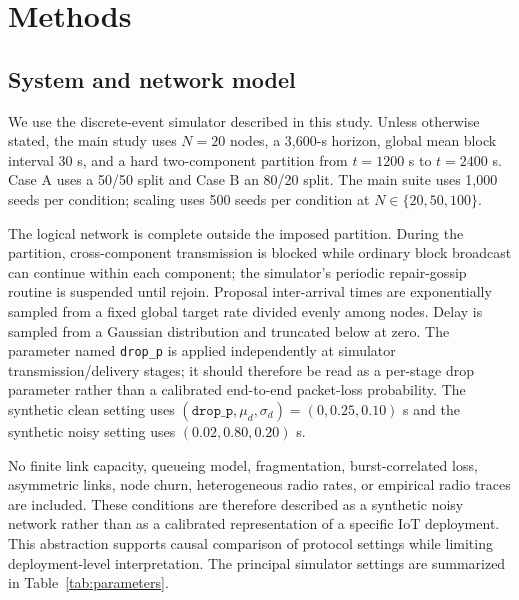 \documentclass[11pt]{article}
\begin{document}
\section{Methods}
\subsection{System and network model}
We use the discrete-event simulator described in this study. Unless otherwise stated, the main study uses $N=20$ nodes, a 3,600-s horizon, global mean block interval 30 s, and a hard two-component partition from $t=1200$ s to $t=2400$ s. Case A uses a 50/50 split and Case B an 80/20 split. The main suite uses 1,000 seeds per condition; scaling uses 500 seeds per condition at $N\in\{20,50,100\}$.

The logical network is complete outside the imposed partition. During the partition, cross-component transmission is blocked while ordinary block broadcast can continue within each component; the simulator's periodic repair-gossip routine is suspended until rejoin. Proposal inter-arrival times are exponentially sampled from a fixed global target rate divided evenly among nodes. Delay is sampled from a Gaussian distribution and truncated below at zero. The parameter named \texttt{drop\_p} is applied independently at simulator transmission/delivery stages; it should therefore be read as a per-stage drop parameter rather than a calibrated end-to-end packet-loss probability. The synthetic clean setting uses $(\texttt{drop\_p},\mu_{d},\sigma_d)=(0,0.25,0.10)$ s and the synthetic noisy setting uses $(0.02,0.80,0.20)$ s.

No finite link capacity, queueing model, fragmentation, burst-correlated loss, asymmetric links, node churn, heterogeneous radio rates, or empirical radio traces are included. These conditions are therefore described as a synthetic noisy network rather than as a calibrated representation of a specific IoT deployment. This abstraction supports causal comparison of protocol settings while limiting deployment-level interpretation. The principal simulator settings are summarized in Table~\ref{tab:parameters}.
\end{document}
